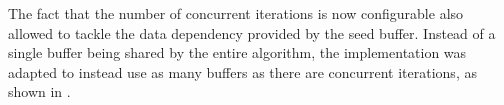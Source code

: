 \documentclass[main.tex]{subfiles}
\begin{document}
The fact that the number of concurrent iterations is now configurable also allowed to tackle the data dependency provided by the seed buffer. Instead of a single buffer being shared by the entire algorithm, the implementation was adapted to instead use as many buffers as there are concurrent iterations, as shown in .
\end{document}
